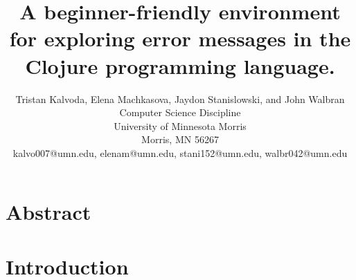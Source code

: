 \documentclass[12pt]{article}
\newcommand{\comment}[1]{{\bf \tt  {#1}}}
\newcommand{\emcomment}[1]{\textcolor{ForestGreen}{\comment{Elena: {#1}}}}
\newcommand{\tkcomment}[1]{\textcolor{Teal}{\comment{Tristan: {#1}}}}
\newcommand{\jscomment}[1]{\textcolor{olive}{\comment{Jaydon: {#1}}}}
\newcommand{\jwcomment}[1]{\textcolor{violet}{\comment{John: {#1}}}}
\begin{document}
\pagestyle{plain}
%

\title{A beginner-friendly environment for exploring error messages in the Clojure programming language.}
%
%

\author{
Tristan Kalvoda, Elena Machkasova, Jaydon Stanislowski, and John Walbran\\
Computer Science Discipline \\
University of Minnesota Morris\\
Morris, MN 56267\\
kalvo007@umn.edu, elenam@umn.edu, stani152@umn.edu, walbr042@umn.edu
}
\date{}
\maketitle
\thispagestyle{empty}

\section*{\centering Abstract}


\newpage
\setcounter{page}{1}

\section{Introduction}

\end{document}
